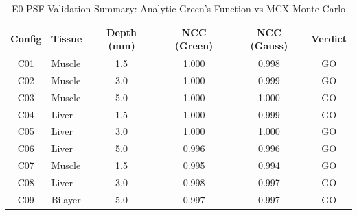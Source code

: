 \begin{table}[t]
\centering
\caption{E0 PSF Validation Summary: Analytic Green's Function vs MCX Monte Carlo}
\label{tab:e0_summary}
\begin{tabular}{clcccc}
\toprule
Config & Tissue & Depth (mm) & NCC (Green) & NCC (Gauss) & Verdict \\
\midrule
C01 & Muscle & 1.5 & 1.000 & 0.998 & GO \\
C02 & Muscle & 3.0 & 1.000 & 0.999 & GO \\
C03 & Muscle & 5.0 & 1.000 & 1.000 & GO \\
C04 & Liver & 1.5 & 1.000 & 0.999 & GO \\
C05 & Liver & 3.0 & 1.000 & 1.000 & GO \\
C06 & Liver & 5.0 & 0.996 & 0.996 & GO \\
C07 & Muscle & 1.5 & 0.995 & 0.994 & GO \\
C08 & Liver & 3.0 & 0.998 & 0.997 & GO \\
C09 & Bilayer & 5.0 & 0.997 & 0.997 & GO \\
\bottomrule
\end{tabular}
\end{table}
